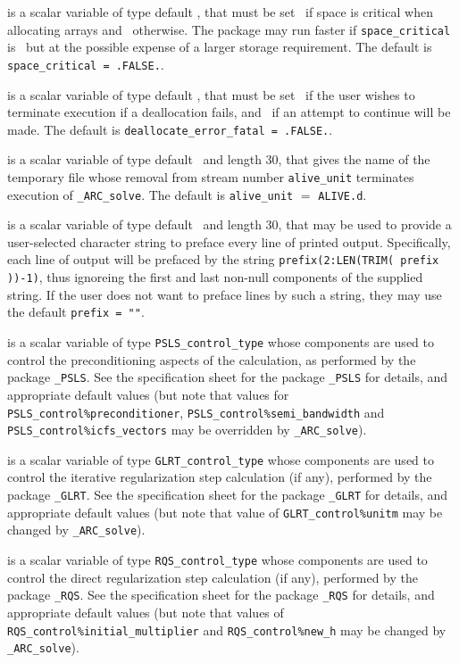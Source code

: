 \documentclass{galahad}
\newcommand{\packagename}{ARC}
\newcommand{\fullpackagename}{\libraryname\_\packagename}
\newcommand{\solver}{{\tt \fullpackagename\_solve}}
\begin{document}
\begin{description}
 is a scalar variable of type default \logical,
that must be set \true\ if space is critical when allocating arrays
and  \false\ otherwise. The package may run faster if
{\tt space\_critical} is \false\ but at the possible expense of a larger
storage requirement. The default is {\tt space\_critical = .FALSE.}.

 is a scalar variable of type default \logical,
that must be set \true\ if the user wishes to terminate execution if
a deallocation  fails, and \false\ if an attempt to continue
will be made. The default is {\tt deallocate\_error\_fatal = .FALSE.}.

 is a scalar variable of type default \character\ and length
30, that gives the name of the temporary file whose removal from stream number
{\tt alive\_unit} terminates execution of \solver.
The default is {\tt alive\_unit} $=$ {\tt ALIVE.d}.

 is a scalar variable of type default \character\
and length 30, that may be used to provide a user-selected
character string to preface every line of printed output.
Specifically, each line of output will be prefaced by the string
{\tt prefix(2:LEN(TRIM( prefix ))-1)},
thus ignoreing the first and last non-null components of the
supplied string. If the user does not want to preface lines by such
a string, they may use the default {\tt prefix = ""}.

 is a scalar variable of type
{\tt PSLS\_control\_type}
whose components are used to control the preconditioning
aspects of the calculation, as performed by the package
{\tt \libraryname\_PSLS}.
See the specification sheet for the package
{\tt \libraryname\_PSLS}
for details, and appropriate default values (but note that values for
{\tt PSLS\_control\%prec\-onditioner},
{\tt PSLS\_control\%semi\_bandwidth} and
{\tt PSLS\_control\%icfs\_vectors}
may be overridden by \solver).

 is a scalar variable of type
{\tt GLRT\_control\_type}
whose components are used to control the
iterative regularization step calculation (if any),
performed by the package
{\tt \libraryname\_GLRT}.
See the specification sheet for the package
{\tt \libraryname\_GLRT}
for details, and appropriate default values
(but note that value of
{\tt GLRT\_control\%unitm}
may be changed by \solver).

 is a scalar variable of type
{\tt RQS\_control\_type}
whose components are used to control the
direct regularization step calculation (if any),
performed by the package
{\tt \libraryname\_RQS}.
See the specification sheet for the package
{\tt \libraryname\_RQS}
for details, and appropriate default values
(but note that values of
{\tt RQS\_control\%init\-ial\_multiplier}
and
{\tt RQS\_control\%new\_h}
may be changed by \solver).


\end{description}
\end{document}
